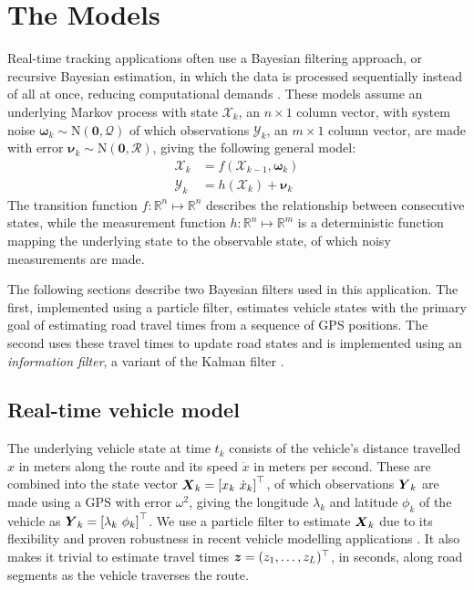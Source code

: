 \section{The Models}
\label{sec:models}

Real-time tracking applications often use
a Bayesian filtering approach,
or recursive Bayesian estimation,
in which the data is processed sequentially instead of all at once,
reducing computational demands
\citep{Anderson_2012}.
These models assume an underlying Markov process with state $\boldsymbol{\mathcal{X}}_k$,
an $n\times1$ column vector,
with system noise $\boldsymbol{\omega}_k\sim\mathrm{N}(\boldsymbol{0},\mathcal{Q})$ 
of which observations $\boldsymbol{\mathcal{Y}}_k$,
an $m\times1$ column vector, are made
with error $\boldsymbol{\nu}_k\sim\mathrm{N}(\boldsymbol{0},\mathcal{R})$,
giving the following general model:
\begin{equation}
\label{eq:rbe_model}
\begin{split}
\boldsymbol{\mathcal{X}}_k &= f(\boldsymbol{\mathcal{X}}_{k-1}, \boldsymbol{\omega}_k) \\
\boldsymbol{\mathcal{Y}}_k &= h(\boldsymbol{\mathcal{X}}_k) + \boldsymbol{\nu}_k
\end{split}
\end{equation}
The transition function $f:\mathbb{R}^n\mapsto\mathbb{R}^n$ 
describes the relationship between consecutive states,
while the measurement function $h:\mathbb{R}^n\mapsto\mathbb{R}^m$ is a deterministic function
mapping the underlying state to the observable state,
of which noisy measurements are made.



The following sections describe two Bayesian filters used in this application.
The first, implemented using a particle filter, estimates vehicle states
with the primary goal of estimating road travel times from a sequence of GPS positions.
The second uses these travel times to update road states 
and is implemented using an \emph{information filter},
a variant of the Kalman filter \citep{Anderson_2012}.



\subsection{Real-time vehicle model}
\label{sec:pf}

The underlying vehicle state at time $t_k$ consists of
the vehicle's distance travelled $x$ in meters along the route and
its speed $\dot x$ in meters per second.
These are combined into the state vector
$\mbox{$\boldsymbol{X}$}_k = \left[x_k\ \dot x_k\right]^\top$,
of which observations $\mbox{$\boldsymbol{Y}$}_k$ are made using a GPS
with error $\omega^2$,
giving the longitude $\lambda_k$ and latitude $\phi_k$ of the vehicle
as $\bY_k = \left[\lambda_k\ \phi_k \right]^\top$.
We use a particle filter to estimate $\mbox{$\boldsymbol{X}$}_k$
due to its flexibility and proven robustness
in recent vehicle modelling applications \citep{Ulmke_2006,Hans_2015}.
It also makes it trivial to estimate travel times
$\boldsymbol{z} = (z_1,\ldots,z_L)^\top$, in seconds, along road segments
as the vehicle traverses the route.


